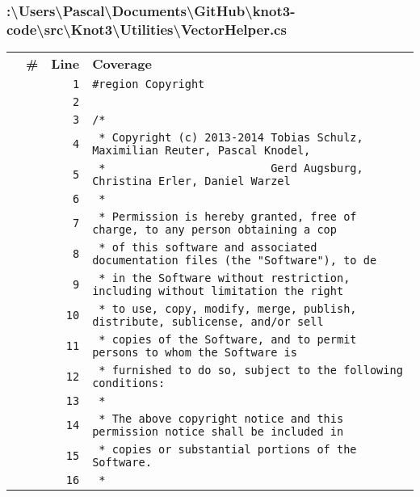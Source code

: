 \documentclass[a4paper,10pt]{article}
\begin{document}
\subsubsection{:\textbackslash Users\textbackslash Pascal\textbackslash Documents\textbackslash GitHub\textbackslash knot3-code\textbackslash src\textbackslash Knot3\textbackslash Utilities\textbackslash VectorHelper.cs}
\begin{longtable}[l]{lrrl}
\textbf{} & \textbf{\#} & \textbf{Line} & \textbf{Coverage}\\
\cellcolor{gray} &  & \verb~1~ & \verb~#region Copyright~\\
\cellcolor{gray} &  & \verb~2~ & \verb~~\\
\cellcolor{gray} &  & \verb~3~ & \verb~/*~\\
\cellcolor{gray} &  & \verb~4~ & \verb~ * Copyright (c) 2013-2014 Tobias Schulz, Maximilian Reuter, Pascal Knodel,~\\
\cellcolor{gray} &  & \verb~5~ & \verb~ *                         Gerd Augsburg, Christina Erler, Daniel Warzel~\\
\cellcolor{gray} &  & \verb~6~ & \verb~ *~\\
\cellcolor{gray} &  & \verb~7~ & \verb~ * Permission is hereby granted, free of charge, to any person obtaining a cop~\\
\cellcolor{gray} &  & \verb~8~ & \verb~ * of this software and associated documentation files (the "Software"), to de~\\
\cellcolor{gray} &  & \verb~9~ & \verb~ * in the Software without restriction, including without limitation the right~\\
\cellcolor{gray} &  & \verb~10~ & \verb~ * to use, copy, modify, merge, publish, distribute, sublicense, and/or sell~\\
\cellcolor{gray} &  & \verb~11~ & \verb~ * copies of the Software, and to permit persons to whom the Software is~\\
\cellcolor{gray} &  & \verb~12~ & \verb~ * furnished to do so, subject to the following conditions:~\\
\cellcolor{gray} &  & \verb~13~ & \verb~ *~\\
\cellcolor{gray} &  & \verb~14~ & \verb~ * The above copyright notice and this permission notice shall be included in ~\\
\cellcolor{gray} &  & \verb~15~ & \verb~ * copies or substantial portions of the Software.~\\
\cellcolor{gray} &  & \verb~16~ & \verb~ *~\\

\end{longtable}
\end{document}
